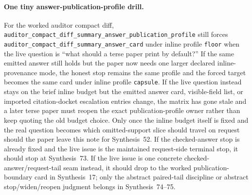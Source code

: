 \documentclass[11pt]{article}
\begin{document}
\paragraph{One tiny answer-publication-profile drill.}
For the worked auditor compact diff, \nolinkurl{auditor_compact_diff_summary_answer_publication_profile} still forces \nolinkurl{auditor_compact_diff_summary_answer_card} under inline profile \nolinkurl{floor} when the live question is ``what should a terse paper print by default?'' If the same emitted answer still holds but the paper now needs one larger declared inline-provenance mode, the honest stop remains the same profile and the forced target becomes the same card under inline profile \nolinkurl{capsule}. If the live question instead stays on the brief inline budget but the emitted answer card, visible-field list, or imported citation-docket escalation entries change, the matrix has gone stale and a later terse paper must reopen the exact publication-profile owner rather than keep quoting the old budget choice. Only once the inline budget itself is fixed and the real question becomes which omitted-support slice should travel on request should the paper leave this note for Synthesis~52. If the checked-answer stop is already fixed and the live issue is the maintained request-side terminal stop, it should stop at Synthesis~73. If the live issue is one concrete checked-answer/request-tail seam instead, it should drop to the worked publication-boundary card in Synthesis~17; only the abstract paired-tail discipline or abstract stop/widen/reopen judgment belongs in Synthesis~74--75.\cite{series:workedexample,series:pairedterminalcitationdiscipline,series:pairedterminalcutoverrules}
\end{document}
